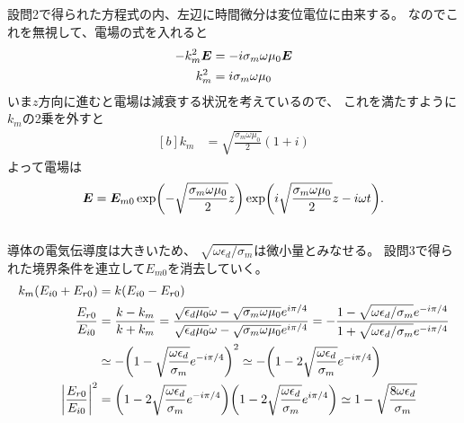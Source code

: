 \documentclass[../../master.tex]{subfiles}
\begin{document}
\subsection{}
設問2で得られた方程式の内、左辺に時間微分は変位電位に由来する。
なのでこれを無視して、電場の式を入れると
\begin{equation}\begin{aligned}[b]
    -k_m^2 \vb*{E} &= -i\sigma_m\omega \mu_0 \vb*{E}\\
    k_m^2 &= i\sigma_m\omega\mu_0
\end{aligned}\end{equation}
いま\(z\)方向に進むと電場は減衰する状況を考えているので、
これを満たすように\(k_m\)の2乗を外すと
\begin{equation}\begin{aligned}[b]
    k_m &= \sqrt{\frac{\sigma_m \omega \mu_0}{2}}(1+i)
\end{aligned}\end{equation}
よって電場は
\begin{equation}\begin{aligned}[b]
    \vb*{E} = \vb*{E}_{m0}\exp(-\sqrt{\frac{\sigma_m \omega \mu_0}{2}}z)\exp(i\sqrt{\frac{\sigma_m \omega \mu_0}{2}}z-i\omega t).
\end{aligned}\end{equation}

\subsection{}
導体の電気伝導度は大きいため、
\(\sqrt{\omega\epsilon_d/\sigma_m}\)は微小量とみなせる。
設問3で得られた境界条件を連立して\(E_{m0}\)を消去していく。
\begin{equation}\begin{aligned}[b]
    k_m(E_{i0}+E_{r0})&=k(E_{i0}-E_{r0})\\
    \frac{E_{r0}}{E_{i0}} &= \frac{k-k_m}{k+k_m}
    =\frac{\sqrt{\epsilon_d\mu_0}\omega-\sqrt{\sigma_m\omega\mu_0}e^{i\pi/4}}{\sqrt{\epsilon_d\mu_0}\omega-\sqrt{\sigma_m\omega\mu_0}e^{i\pi/4}}
    = - \frac{1-\sqrt{\omega\epsilon_d/\sigma_m}e^{-i\pi/4}}{1+\sqrt{\omega\epsilon_d/\sigma_m}e^{-i\pi/4}}\\
    &\simeq -\qty(1-\sqrt{\frac{\omega\epsilon_d}{\sigma_m}}e^{-i\pi/4})^2
    \simeq -\qty(1-2\sqrt{\frac{\omega\epsilon_d}{\sigma_m}}e^{-i\pi/4})\\
    \abs{\frac{E_{r0}}{E_{i0}}}^2
    &= \qty(1-2\sqrt{\frac{\omega\epsilon_d}{\sigma_m}}e^{-i\pi/4})
    \qty(1-2\sqrt{\frac{\omega\epsilon_d}{\sigma_m}}e^{i\pi/4})
    \simeq 1-\sqrt{\frac{8\omega\epsilon_d}{\sigma_m}}
\end{aligned}\end{equation}
\end{document}
